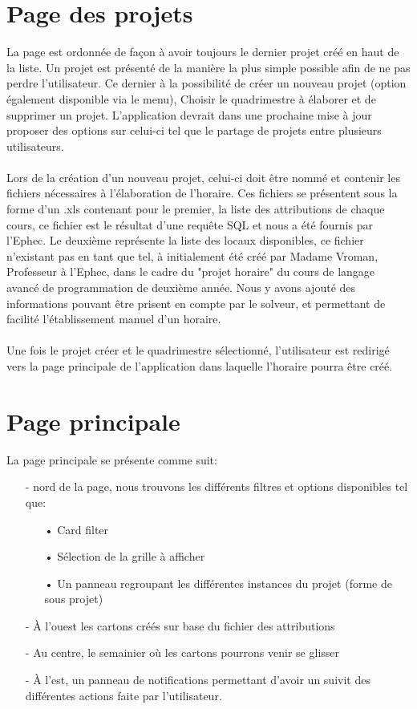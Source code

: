 \section{Page des projets}
La page est ordonnée de façon à avoir toujours le dernier projet créé en haut de la liste. Un projet est présenté de la manière la plus simple possible afin de ne pas perdre l'utilisateur. Ce dernier à la possibilité de créer un nouveau projet (option également disponible via le menu), Choisir le quadrimestre à élaborer et de supprimer un projet. L'application devrait dans une prochaine mise à jour proposer des options sur celui-ci tel que le partage de projets entre plusieurs utilisateurs.\\
\\
Lors de la création d'un nouveau projet, celui-ci doit être nommé et contenir les fichiers nécessaires à l'élaboration de l'horaire. Ces fichiers se présentent sous la forme d'un .xls contenant pour le premier, la liste des attributions de chaque cours, ce fichier est le résultat d'une requête SQL et nous a été fournis par l'Ephec. Le deuxième représente la liste des locaux disponibles, ce fichier n'existant pas en tant que tel, à initialement été créé par Madame Vroman, Professeur à l'Ephec, dans le cadre du "projet horaire" du cours de langage avancé de programmation de deuxième année. Nous y avons ajouté des informations pouvant être prisent en compte par le solveur, et permettant de facilité l'établissement manuel d'un horaire.\\
\\
Une fois le projet créer et le quadrimestre sélectionné, l'utilisateur est redirigé vers la page principale de l'application dans laquelle l'horaire pourra être créé.

\section{Page principale}
La page principale se présente comme suit:\\

\begin{itemize}	
	
	\item[-] nord de la page, nous trouvons les différents filtres et options disponibles tel que:\\
	\begin{itemize}
		\item[•] Card filter
		\item[•] Sélection de la grille à afficher
		\item[•] Un panneau regroupant les différentes instances du projet (forme de sous projet)\\
	\end{itemize}
	\item[-] À l'ouest les cartons créés sur base du fichier des attributions\\
	\item[-] Au centre, le semainier où les cartons pourrons venir se glisser\\
	\item[-] À l'est, un panneau de notifications permettant d'avoir un suivit des différentes actions faite par l'utilisateur.
\end{itemize}
